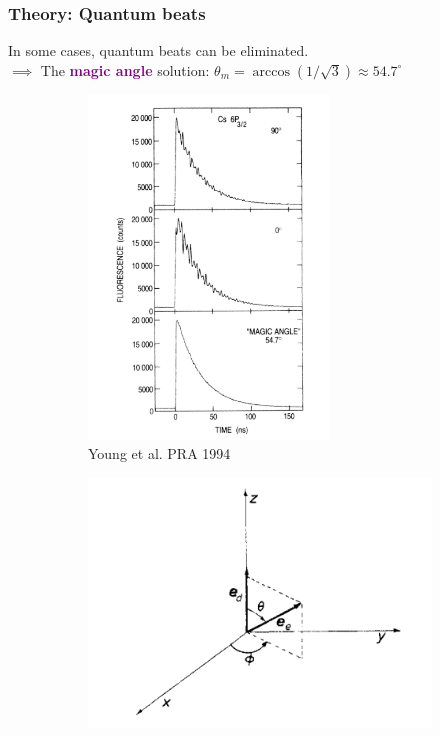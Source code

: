 \documentclass{beamer}
\theoremstyle{definition}
\begin{document}
\begin{frame}
\frametitle{Theory: Quantum beats}

In some cases, quantum beats can be eliminated.\\

$\implies$ The \textbf{\textcolor{purple}{magic angle}} solution: $\theta_m = \arccos(1/\sqrt{3}) \approx 54.7^\circ$

\begin{figure}[!htb]
	\centering	
	\vspace{-10pt}
	\begin{subfigure}{0.49\textwidth}
		\centering
		\includegraphics[width=0.7\textwidth]{young}
		\caption{Young et al. PRA 1994}
	\end{subfigure}
	\begin{subfigure}{0.49\textwidth}
		\centering
		\includegraphics[width=\textwidth]{beats_1}

\end{subfigure}
\end{figure}
\end{frame}
\end{document}
